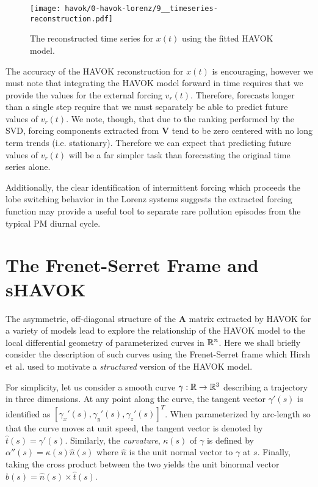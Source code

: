 \begin{figure}[h]
  \vspace{-0.5cm}
  \centering
  \texttt{[image: havok/0-havok-lorenz/9\_\_timeseries-reconstruction.pdf]}
  \caption{The reconstructed time series for $x(t)$ using the fitted HAVOK model.}
  \label{fig:lorenz-reconstruction}
  \vspace{-1cm}
\end{figure}


\newpage

The accuracy of the HAVOK reconstruction for $x(t)$ is encouraging, however we
must note that integrating the HAVOK model forward in time requires that we
provide the values for the external forcing $v_r(t)$. Therefore, forecasts
longer than a single step require that we must separately be able to predict
future values of $v_r(t)$. We note, though, that due to the ranking performed by
the SVD, forcing components extracted from $\mathbf{V}$ tend to be zero centered
with no long term trends (i.e. stationary). Therefore we can expect that
predicting future values of $v_r(t)$ will be a far simpler task than forecasting
the original time series alone.

Additionally, the clear identification of intermittent forcing which proceeds
the lobe switching behavior in the Lorenz systems suggests the extracted forcing
function may provide a useful tool to separate rare pollution episodes from the
typical PM diurnal cycle.

\section{The Frenet-Serret Frame and sHAVOK}

The asymmetric, off-diagonal structure of the $\mathbf{A}$ matrix extracted by
HAVOK for a variety of models lead \cite{havok-diffgeo} to explore the
relationship of the HAVOK model to the local differential geometry of
parameterized curves in $\mathbb{R}^n$. Here we shall briefly consider the description
of such curves using the Frenet-Serret frame which Hirsh et al. used
to motivate a \textit{structured} version of the HAVOK model.

For simplicity, let us consider a smooth curve $\gamma:\mathbb{R} \to \mathbb{R}^3$ describing
a trajectory in three dimensions. At any point along the curve, the
tangent vector $\gamma'(s)$ is identified as
$[\gamma_x'(s), \gamma_y'(s), \gamma_z'(s)]^T$. When
parameterized by arc-length so that the curve moves at unit speed, the tangent
vector is denoted by $\hat{t}(s)=\gamma'(s)$. Similarly, the \textit{curvature},
$\kappa(s)$ of $\gamma$ is defined by  $\alpha''(s) = \kappa(s)\hat{n}(s)$ where
$\hat{n}$ is the unit normal vector to $\gamma$ at $s$. Finally, taking the
cross product between the two yields the unit binormal vector $\hat{b}(s) =
\hat{n}(s) \times \hat{t}(s)$.

